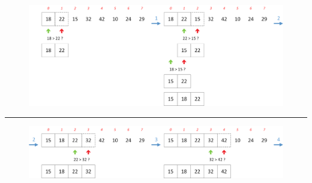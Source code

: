 \documentclass[11pt,a4paper]{article}
\begin{document}

\vfillFirst
\vfillLast


\begin{figure}[ht!]
\centering
\centerline{
\includegraphics[width=1.2\textwidth]{img/tris/2_per_pages/InsertionSort_part1.png}
}
\end{figure}

\medskip

\par\rule{\textwidth}{0.5pt} 

\medskip

\begin{figure}[ht!]
\centering
\centerline{
\includegraphics[width=1.2\textwidth]{img/tris/2_per_pages/InsertionSort_part2.png}
}
\end{figure}

\clearpage

\vfillFirst
\end{document}
